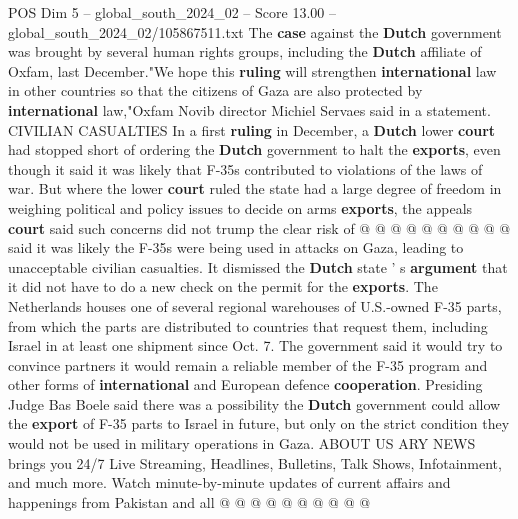 \begin{textsample}{POS Dim 5 – global\_south\_2024\_02 – Score 13.00 – global\_south\_2024\_02/105867511.txt}
The \textbf{case} against the \textbf{Dutch} government was brought by several human rights groups, including the \textbf{Dutch} affiliate of Oxfam, last December."We hope this \textbf{ruling} will strengthen \textbf{international} law in other countries so that the citizens of Gaza are also protected by \textbf{international} law,"Oxfam Novib director Michiel Servaes said in a statement.
CIVILIAN CASUALTIES In a first \textbf{ruling} in December, a \textbf{Dutch} lower \textbf{court} had stopped short of ordering the \textbf{Dutch} government to halt the \textbf{exports}, even though it said it was likely that F-35s contributed to violations of the laws of war.
But where the lower \textbf{court} ruled the state had a large degree of freedom in weighing political and policy issues to decide on arms \textbf{exports}, the appeals \textbf{court} said such concerns did not trump the clear risk of @ @ @ @ @ @ @ @ @ @ said it was likely the F-35s were being used in attacks on Gaza, leading to unacceptable civilian casualties.
It dismissed the \textbf{Dutch} state ' s \textbf{argument} that it did not have to do a new check on the permit for the \textbf{exports}.
The Netherlands houses one of several regional warehouses of U.S.-owned F-35 parts, from which the parts are distributed to countries that request them, including Israel in at least one shipment since Oct. 7.
The government said it would try to convince partners it would remain a reliable member of the F-35 program and other forms of \textbf{international} and European defence \textbf{cooperation}.
Presiding Judge Bas Boele said there was a possibility the \textbf{Dutch} government could allow the \textbf{export} of F-35 parts to Israel in future, but only on the strict condition they would not be used in military operations in Gaza.
ABOUT US ARY NEWS brings you 24/7 Live Streaming, Headlines, Bulletins, Talk Shows, Infotainment, and much more.
Watch minute-by-minute updates of current affairs and happenings from Pakistan and all @ @ @ @ @ @ @ @ @ @

\end{textsample}
